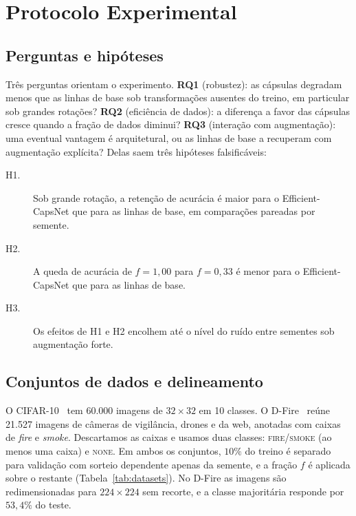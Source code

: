 \chapter{Protocolo Experimental}
\label{ch:protocol}

\section{Perguntas e hipóteses}
\label{sec:protocol:hypotheses}

Três perguntas orientam o experimento. \textbf{RQ1} (robustez): as cápsulas
degradam menos que as linhas de base sob transformações ausentes do treino, em
particular sob grandes rotações? \textbf{RQ2} (eficiência de dados): a
diferença a favor das cápsulas cresce quando a fração de dados diminui?
\textbf{RQ3} (interação com augmentação): uma eventual vantagem é arquitetural,
ou as linhas de base a recuperam com augmentação explícita? Delas saem três
hipóteses falsificáveis:

\begin{description}
  \item[H1.] Sob grande rotação, a retenção de acurácia é maior para o
             Efficient-CapsNet que para as linhas de base, em comparações
             pareadas por semente.
  \item[H2.] A queda de acurácia de $f = 1{,}00$ para $f = 0{,}33$ é menor para
             o Efficient-CapsNet que para as linhas de base.
  \item[H3.] Os efeitos de H1 e H2 encolhem até o nível do ruído entre sementes
             sob augmentação forte.
\end{description}

\section{Conjuntos de dados e delineamento}
\label{sec:protocol:data}

O CIFAR-10~\cite{krizhevsky2009cifar} tem 60.000 imagens de $32\times32$ em 10
classes. O D-Fire~\cite{venancio2022dfire} reúne 21.527 imagens de câmeras de
vigilância, drones e da web, anotadas com caixas de \emph{fire} e \emph{smoke}.
Descartamos as caixas e usamos duas classes: \textsc{fire/smoke} (ao menos uma
caixa) e \textsc{none}. Em ambos os conjuntos, $10\%$ do treino é separado para
validação com sorteio dependente apenas da semente, e a fração $f$ é aplicada
sobre o restante (Tabela~\ref{tab:datasets}). No D-Fire as imagens são
redimensionadas para $224\times224$ sem recorte, e a classe majoritária
responde por $53{,}4\%$ do teste.

